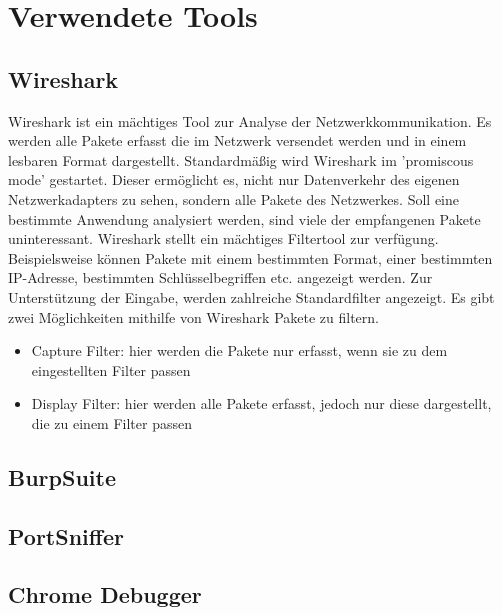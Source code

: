 \section{Verwendete Tools}\label{sec:kaptiel}
\subsection{Wireshark}
Wireshark ist ein mächtiges Tool zur Analyse der Netzwerkkommunikation.
Es werden alle Pakete erfasst die im Netzwerk versendet werden und in einem 
lesbaren Format dargestellt. 
Standardmäßig wird Wireshark im 'promiscous mode' gestartet. Dieser ermöglicht
es, nicht nur Datenverkehr des eigenen Netzwerkadapters zu sehen, sondern alle Pakete
des Netzwerkes. 
Soll eine bestimmte Anwendung analysiert werden, sind viele der empfangenen Pakete
uninteressant. Wireshark stellt ein mächtiges Filtertool zur verfügung. 
Beispielsweise können Pakete mit einem bestimmten Format, einer bestimmten IP-Adresse, 
bestimmten Schlüsselbegriffen etc. angezeigt werden. Zur Unterstützung der Eingabe, werden
zahlreiche Standardfilter angezeigt. 
Es gibt zwei Möglichkeiten mithilfe von Wireshark Pakete zu filtern.
\begin{itemize}
    \item Capture Filter: hier werden die Pakete nur erfasst, wenn sie zu dem eingestellten Filter passen
    \item Display Filter: hier werden alle Pakete erfasst, jedoch nur diese dargestellt, die zu einem Filter passen
\end{itemize}
\cite{WS1}

\subsection{BurpSuite}
\subsection{PortSniffer}
\subsection{Chrome Debugger}

